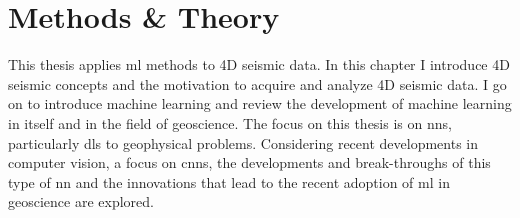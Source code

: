 \chapter{Methods \& Theory}

This thesis applies \acl{ml} methods to 4D seismic data. In this chapter I introduce 4D seismic concepts and the motivation to acquire and analyze 4D seismic data. I go on to introduce machine learning and review the development of machine learning in itself and in the field of geoscience. The focus on this thesis is on \aclp{nn}, particularly \aclp{dl} to geophysical problems. Considering recent developments in computer vision, a focus on \aclp{cnn}, the developments and break-throughs of this type of \ac{nn} and the innovations that lead to the recent adoption of \acl{ml} in geoscience are explored.







